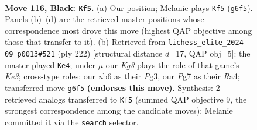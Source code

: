 \documentclass[11pt]{article}
\begin{document}
\clearpage

\begin{figure}[p]\centering
\begin{subfigure}{0.46\textwidth}\centering
\resizebox{\linewidth}{!}{%
\newchessgame
\chessboard[
  setfen={5R2/6p1/1N3pk1/7p/7P/6PK/r7/8 b - - 57 116},
  showmover=false,
  pgfstyle=straightmove, color=movearrow, markmove={g6-f5}
]}
\caption{}
\end{subfigure}\hfill
\begin{subfigure}{0.46\textwidth}\centering
\resizebox{\linewidth}{!}{%
\newchessgame
\chessboard[
  setfen={8/8/6pk/7p/R6P/1r2KPP1/8/8 w - - 33 112},
  showmover=false,
  pgfstyle=straightmove, color=movearrow, markmove={e3-e4}
]}
\caption{}
\end{subfigure}
\\[4pt]

\caption{\textbf{Move 116, Black: \texttt{Kf5}.} (a) Our position; Melanie plays \texttt{Kf5} (\texttt{g6f5}). Panels (b)--(d) are the retrieved master positions whose correspondence most drove this move (highest QAP objective among those that transfer to it). (b) Retrieved from \texttt{lichess\_elite\_2024-09\_p0013\#521} (ply 222) [structural distance $d$=17, QAP obj=5]: the master played \texttt{Ke4}; under $\mu$ our \emph{Kg3} plays the role of that game's \emph{Ke3}; cross-type roles: our \emph{n}b6 as their \emph{P}g3, our \emph{P}g7 as their \emph{R}a4; transferred move \texttt{g6f5} \textbf{(endorses this move)}. Synthesis: 2 retrieved analogs transferred to \texttt{Kf5} (summed QAP objective 9, the strongest correspondence among the candidate moves); Melanie committed it via the \texttt{search} selector.}
\label{fig:thought-m231}
\end{figure}

\clearpage
\end{document}
